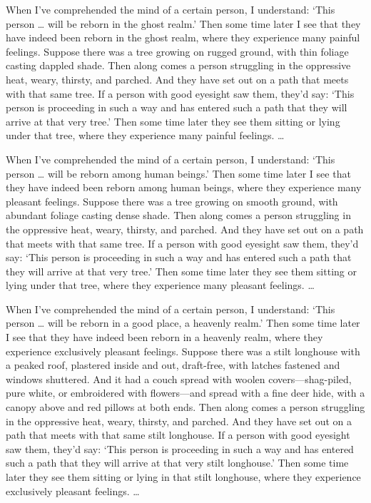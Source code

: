 \documentclass[12pt,openany]{book}%
\begin{document}
When I’ve comprehended the mind of a certain person, I understand: ‘This person … will be reborn in the ghost realm.’ Then some time later I see that they have indeed been reborn in the ghost realm, where they experience many painful feelings. Suppose there was a tree growing on rugged ground, with thin foliage casting dappled shade. Then along comes a person struggling in the oppressive heat, weary, thirsty, and parched. And they have set out on a path that meets with that same tree. If a person with good eyesight saw them, they’d say: ‘This person is proceeding in such a way and has entered such a path that they will arrive at that very tree.’ Then some time later they see them sitting or lying under that tree, where they experience many painful feelings. … 

When I’ve comprehended the mind of a certain person, I understand: ‘This person … will be reborn among human beings.’ Then some time later I see that they have indeed been reborn among human beings, where they experience many pleasant feelings. Suppose there was a tree growing on smooth ground, with abundant foliage casting dense shade. Then along comes a person struggling in the oppressive heat, weary, thirsty, and parched. And they have set out on a path that meets with that same tree. If a person with good eyesight saw them, they’d say: ‘This person is proceeding in such a way and has entered such a path that they will arrive at that very tree.’ Then some time later they see them sitting or lying under that tree, where they experience many pleasant feelings. … 

When I’ve comprehended the mind of a certain person, I understand: ‘This person … will be reborn in a good place, a heavenly realm.’ Then some time later I see that they have indeed been reborn in a heavenly realm, where they experience exclusively pleasant feelings. Suppose there was a stilt longhouse with a peaked roof, plastered inside and out, draft-free, with latches fastened and windows shuttered. And it had a couch spread with woolen covers—shag-piled, pure white, or embroidered with flowers—and spread with a fine deer hide, with a canopy above and red pillows at both ends. Then along comes a person struggling in the oppressive heat, weary, thirsty, and parched. And they have set out on a path that meets with that same stilt longhouse. If a person with good eyesight saw them, they’d say: ‘This person is proceeding in such a way and has entered such a path that they will arrive at that very stilt longhouse.’ Then some time later they see them sitting or lying in that stilt longhouse, where they experience exclusively pleasant feelings. … 
\end{document}
